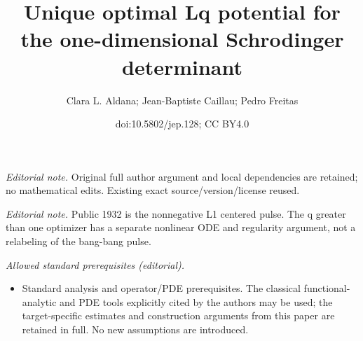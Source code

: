 \documentclass[10pt,a4paper]{amsart}
\title{Unique optimal Lq potential for the one-dimensional Schrodinger determinant}
\author{Clara L. Aldana; Jean-Baptiste Caillau; Pedro Freitas}
\date{doi:10.5802/jep.128; CC BY4.0}
\theoremstyle{plain}
\theoremstyle{definition}
\begin{document}
\maketitle
\noindent\textit{Editorial note.} Original full author argument and local dependencies are retained; no mathematical edits. Existing exact source/version/license reused.\par\medskip
\noindent\textit{Editorial note.} Public 1932 is the nonnegative L1 centered pulse. The q greater than one optimizer has a separate nonlinear ODE and regularity argument, not a relabeling of the bang-bang pulse.\par\medskip
\noindent\textit{Allowed standard prerequisites (editorial).}\begin{itemize}
\item Standard analysis and operator/PDE prerequisites. The classical functional-analytic and PDE tools explicitly cited by the authors may be used; the target-specific estimates and construction arguments from this paper are retained in full. No new assumptions are introduced.
\end{itemize}\medskip
\end{document}
